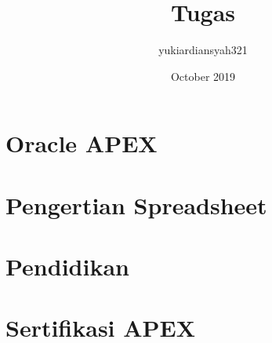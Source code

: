 \documentclass{article}
\title{Tugas}
\author{yukiardiansyah321 }
\date{October 2019}
\begin{document}
\maketitle


\section{Oracle APEX}
\usepackage{Oracle Apex Adalah Aplikais Yang Digunakan Oleh Pelanggan Nyata Untuk Aplikasi Nyata Yang Digunakan Untuk Aplikasi Kritis Oportuninistik Dan Misi Yang Melayani Puluhan Ribu Pengguna Produk Mapan Pertama Kali Dirilis Pada Tahun 2004 Platform Pengembangan Aplikasi Kode Rendah Yang Paling Kuat: Memungkinkan Pengembangan Untuk Ficus Dalam Memecahkan Masalah Bisnis Dan Memberikan Solusi Yang Unggul, Dengan Lebih Sedikit Waktu Dan Upaya Yang Dihabiskan Untuk Pengodean Tingkat Rendah Biasa Dan Berulang Terus Berkembang. Oracle Install Base Mengadopsi Oracle Apex Untuk Meningkatkan Jumlah Proyek Dan Semakin Menjadi Standar IT Korporat Yang Disetujui
}

\section{Pengertian Spreadsheet}

\usepackage {Spreadsheet: Memungkinkan Pengguna Untuk Menyimpan Berbagai Informasi Yang Sangat Lengkap, Pada Setiap Kolomnya Bisa Menyimpan Berbagai Data Informasi Yang Berbeda Dari Informasi Yang Di Perlukan.App From Spreadsheet Disini Berupa Beberapa Project Dan Nama Tugas Nya Serta Keterangan Lainnya Seperti Tanggal Mulai, Tanggal Selesai, Status, Di Ttd Oleh,Biaya, Budget Tersedia, Dan Lebih Kurangnya Dari Budget.}

\section {Pendidikan}
\usepackage{Apakah Anda Seorang Siswa Atau Guru SQL, Database Relasional, atau Pengembangan Aplikasi, Anda Dapat Menggunakan Oracle Apex Untuk Sangat Memperkaya Pengalaman Pendidikan Anda?}

\section {Sertifikasi APEX}
\usepackage{Setelah Anda Mahir Mengembangkan Aplikasi APEX, Anda Dapat Mengikuti Ujian Sertifikasi Oracle Menjadi Aplikasi Oracle Express 18: Profesional Bersertifikat Pengembang.Menonjol Di Antara Rekan-Rekan Anda, Dan Buktikan Kepada Semua Orang Bahwa Anda Tahu Cara Membangun Aplikasi Yang Kuat Dengan Menggunakan Apex.}
\end{document}
